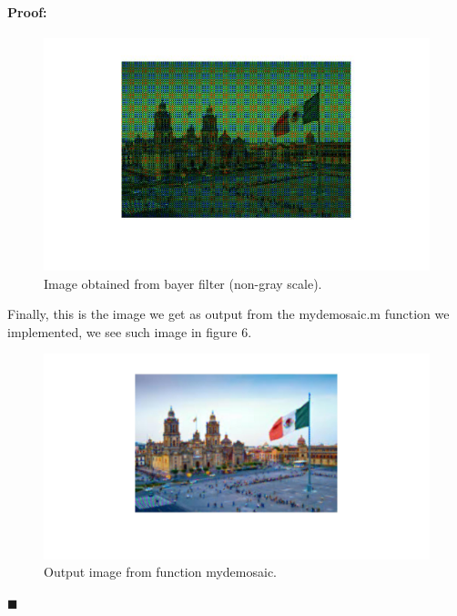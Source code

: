 \documentclass[12pt]{article}
\newenvironment{proof}{\paragraph{Proof: }}{\hfill$\blacksquare$}
\begin{document}
\begin{proof}
\begin{figure}[h]
\begin{center}
\centering
\includegraphics[scale=0.50]{CDMX_bayer_filter.jpg}
\caption{Image obtained from bayer filter (non-gray scale).}
\label{fig:mesh1}
\end{center}
\end{figure}

Finally, this is the image we get as output from the mydemosaic.m function we implemented, we see such image in figure 6.

\begin{figure}[h]
\begin{center}
\centering
\includegraphics[scale=0.25]{CDMX_mydemosaic.jpg}
\caption{Output image from function mydemosaic.}
\label{fig:mesh1}
\end{center}
\end{figure}





\end{proof}
\end{document}
